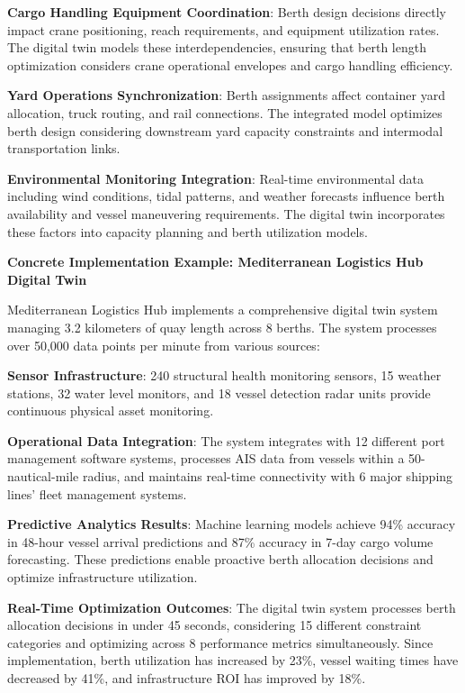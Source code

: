 \documentclass{article}
\begin{document}
\textbf{Cargo Handling Equipment Coordination}: Berth design decisions directly impact crane positioning, reach requirements, and equipment utilization rates. The digital twin models these interdependencies, ensuring that berth length optimization considers crane operational envelopes and cargo handling efficiency.

\textbf{Yard Operations Synchronization}: Berth assignments affect container yard allocation, truck routing, and rail connections. The integrated model optimizes berth design considering downstream yard capacity constraints and intermodal transportation links.

\textbf{Environmental Monitoring Integration}: Real-time environmental data including wind conditions, tidal patterns, and weather forecasts influence berth availability and vessel maneuvering requirements. The digital twin incorporates these factors into capacity planning and berth utilization models.

\textbf{Concrete Implementation Example: Mediterranean Logistics Hub Digital Twin}

Mediterranean Logistics Hub implements a comprehensive digital twin system managing 3.2 kilometers of quay length across 8 berths. The system processes over 50,000 data points per minute from various sources:

\textbf{Sensor Infrastructure}: 240 structural health monitoring sensors, 15 weather stations, 32 water level monitors, and 18 vessel detection radar units provide continuous physical asset monitoring.

\textbf{Operational Data Integration}: The system integrates with 12 different port management software systems, processes AIS data from vessels within a 50-nautical-mile radius, and maintains real-time connectivity with 6 major shipping lines' fleet management systems.

\textbf{Predictive Analytics Results}: Machine learning models achieve 94\% accuracy in 48-hour vessel arrival predictions and 87\% accuracy in 7-day cargo volume forecasting. These predictions enable proactive berth allocation decisions and optimize infrastructure utilization.

\textbf{Real-Time Optimization Outcomes}: The digital twin system processes berth allocation decisions in under 45 seconds, considering 15 different constraint categories and optimizing across 8 performance metrics simultaneously. Since implementation, berth utilization has increased by 23\%, vessel waiting times have decreased by 41\%, and infrastructure ROI has improved by 18\%.
\end{document}
